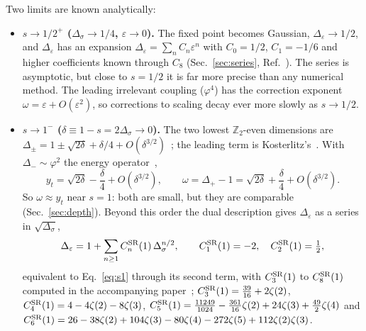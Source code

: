 \documentclass[10pt,a4paper]{article}
\newcommand{\Ds}{\Delta_\sigma}
\newcommand{\De}{\Delta_\varepsilon}
\begin{document}
Two limits are known analytically:
\begin{itemize}
\item \textbf{$s\to1/2^+$ ($\Ds\to1/4$, $\varepsilon\to0$).} The fixed point becomes Gaussian, $\De\to1/2$, and $\De$ has an
  expansion $\De=\sum_nC_n\varepsilon^n$ with $C_0=1/2$, $C_1=-1/6$ and higher coefficients known through $C_8$ (Sec.~\ref{sec:series},
  Ref.~\cite{Paper}). The series is asymptotic, but close to $s=1/2$ it is far more precise than any numerical method. The leading
  irrelevant coupling ($\varphi^4$) has the correction exponent $\omega=\varepsilon+O(\varepsilon^2)$, so corrections to scaling
  decay ever more slowly as $s\to1/2$.
\item \textbf{$s\to1^-$ ($\delta\equiv1-s=2\Ds\to0$).} The two lowest $\mathbb Z_2$-even dimensions are
  $\Delta_\pm=1\pm\sqrt{2\delta}+\delta/4+O(\delta^{3/2})$~\cite{BLMV25,BLMV26}; the leading term is Kosterlitz's~\cite{Kosterlitz1976}.
  With $\Delta_-\sim\varphi^2$ the energy operator~\cite{BLMV25},
  \begin{equation}
  y_t=\sqrt{2\delta}-\frac\delta4+O(\delta^{3/2}),\qquad \omega=\Delta_+-1=\sqrt{2\delta}+\frac\delta4+O(\delta^{3/2}).\label{eq:s1}
  \end{equation}
  So $\omega\approx y_t$ near $s=1$: both are small, but they are comparable (Sec.~\ref{sec:depth}). Beyond this order the dual
  description gives $\De$ as a series in $\sqrt{\Ds}$,
  \begin{equation}
  \De=1+\sum_{n\ge1}C^{\rm SR}_n(1)\,\Ds^{n/2},\qquad C^{\rm SR}_1(1)=-2,\quad C^{\rm SR}_2(1)=\tfrac12,\label{eq:dual}
  \end{equation}
  equivalent to Eq.~\eqref{eq:s1} through its second term, with $C^{\rm SR}_3(1)$ to $C^{\rm SR}_8(1)$ computed in the accompanying
  paper~\cite{Paper}; $C^{\rm SR}_3(1)=\frac{39}{16}+2\zeta(2)$, $C^{\rm SR}_4(1)=4-4\zeta(2)-8\zeta(3)$,
  $C^{\rm SR}_5(1)=\frac{11249}{1024}-\frac{361}{16}\zeta(2)+24\zeta(3)+\frac{49}{2}\zeta(4)$ and
  $C^{\rm SR}_6(1)=26-38\zeta(2)+104\zeta(3)-80\zeta(4)-272\zeta(5)+112\zeta(2)\zeta(3)$.
\end{itemize}
\end{document}
